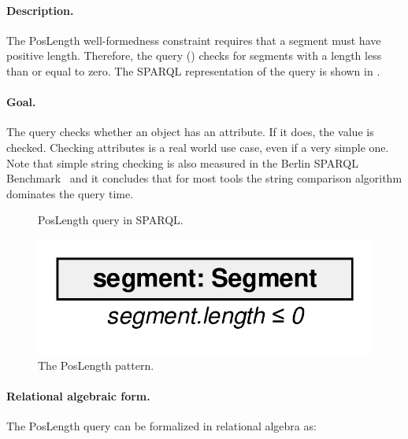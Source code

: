 \paragraph{Description.} The \textsf{PosLength} well-formedness constraint requires that a segment must have positive length. Therefore, the query () checks for segments with a length less than or equal to zero. The SPARQL representation of the query is shown in .

\paragraph{Goal.} The query checks whether an object has an attribute. If it does, the value is checked. Checking attributes is a real world use case, even if a very simple one. Note that simple string checking is also measured in the Berlin SPARQL Benchmark~\cite{BSBM} and it concludes that for most tools the string comparison algorithm dominates the query time.

\begin{figure}[htb]
\centering
\begin{minipage}{0.5\textwidth}
  { \alignListing
    }
  \caption{\textsf{PosLength} query in SPARQL.}
  \label{lst:poslength-sparql}
\end{minipage}
\end{figure}

\begin{figure}[htb]
		\centering
		\includegraphics[scale=0.4]{figures/pattern-poslength}
		\caption{The \textsf{PosLength} pattern.}
		\label{fig:pattern-poslength}
\end{figure}

\paragraph{Relational algebraic form.} The \textsf{PosLength} query can be formalized in relational algebra as:


